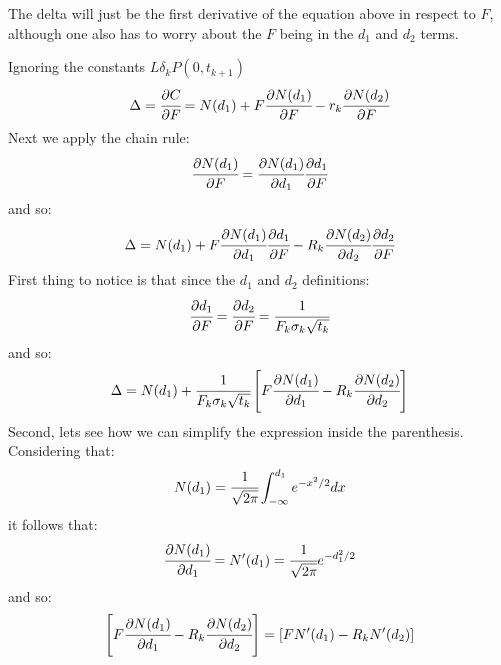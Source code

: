 \documentclass[12pt,a4paper]{exam}
\begin{document}
\begin{questions}
\begin{solution}
The delta will just be the first derivative of the equation above in respect to $F$, although one also has to worry about the $F$ being in the $d_1$ and $d_2$ terms.

Ignoring the constants $L\delta_k P(0,t_{k+1})$
\begin{equation*}
\Delta =\cfrac{\partial C}{\partial F} = N(d_1) + F\cfrac{\partial N(d_1)}{\partial F} - r_k\cfrac{\partial N(d_2)}{\partial F}
\end{equation*}
Next we apply the chain rule:
\begin{equation*}
	\cfrac{\partial N(d_1)}{\partial F} = \cfrac{\partial N(d_1)}{\partial d_1}\cfrac{\partial d_1}{\partial F}
\end{equation*}
and so:
\begin{equation*}
\Delta = N(d_1) + F\cfrac{\partial N(d_1)}{\partial d_1}\cfrac{\partial d_1}{\partial F} - R_k \cfrac{\partial N(d_2)}{\partial d_2}\cfrac{\partial d_2}{\partial F}
\end{equation*}
First thing to notice is that since the $d_1$ and $d_2$ definitions:
\begin{equation*}
\cfrac{\partial d_1}{\partial F} = \cfrac{\partial d_2}{\partial F}=\cfrac{1}{F_k\sigma_k\sqrt{t_k}}
\end{equation*}
and so:
\begin{equation*}
\Delta = N(d_1) + \cfrac{1}{F_k\sigma_k\sqrt{t_k}}\left[F\cfrac{\partial N(d_1)}{\partial d_1} - R_k \cfrac{\partial N(d_2)}{\partial d_2}\right]
\end{equation*}
Second, lets see how we can simplify the expression inside the parenthesis. Considering that:
\begin{equation*}
N(d_1) = \cfrac{1}{\sqrt{2\pi}}\int_{-\infty}^{d_1} e^{-x^2/2}dx
\end{equation*}	
it follows that:
\begin{equation*}
\cfrac{\partial N(d_1)}{\partial d_1}=N'(d_1)=\cfrac{1}{\sqrt{2\pi}}e^{-d_1^2/2}
\end{equation*}
and so:
\begin{equation*}
\left[F\cfrac{\partial N(d_1)}{\partial d_1} - R_k \cfrac{\partial N(d_2)}{\partial d_2}\right] = \left[FN'(d_1)-R_kN'(d_2)\right]
\end{equation*}


\end{solution}
\end{questions}
\end{document}
